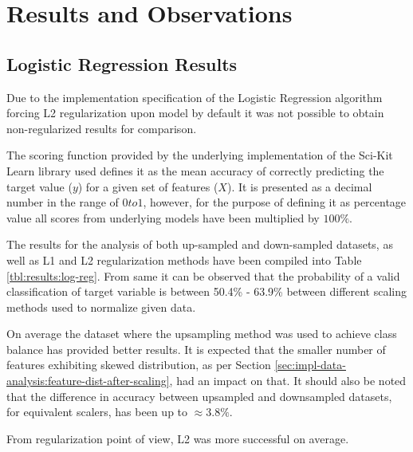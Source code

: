 \chapter{Results and Observations}\label{chp:results-and-observations}
\section{Logistic Regression Results}\label{sec:results:log-reg}
Due to the implementation specification of the Logistic Regression algorithm forcing L2 regularization upon model by default it was not possible to obtain non-regularized results for comparison.

The scoring function provided by the underlying implementation of the Sci-Kit Learn library used defines it as the mean accuracy of correctly predicting the target value ($y$) for a given set of features ($X$). It is presented as a decimal number in the range of $ 0 to 1$, however, for the purpose of defining it as percentage value all scores from underlying models have been multiplied by $100\%$.

The results for the analysis of both up-sampled and down-sampled datasets, as well as L1 and L2 regularization methods have been compiled into Table \ref{tbl:results:log-reg}. From same it can be observed that the probability of a valid classification of \isBug{} target variable is between 50.4\% - 63.9\% between different scaling methods used to normalize given data.

On average the dataset where the upsampling method was used to achieve class balance has provided better results. It is expected that the smaller number of features exhibiting skewed distribution, as per Section \ref{sec:impl-data-analysis:feature-dist-after-scaling}, had an impact on that. It should also be noted that the difference in accuracy between upsampled and downsampled datasets, for equivalent scalers, has been up to $\approx 3.8\%$.

From regularization point of view, L2 was more successful on average.

